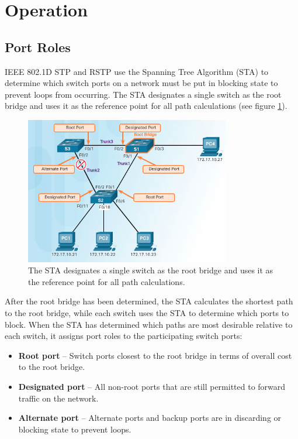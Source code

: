 \section{Operation}
\subsection{Port Roles}
IEEE 802.1D STP and RSTP use the Spanning Tree Algorithm (STA) to determine which switch ports on a network must be put in blocking state to prevent loops from occurring. The STA designates a single switch as the root bridge and uses it as the reference point for all path calculations (see figure \ref{STP-operation}). \par 
\begin{figure}[hbtp]
\centering
\includegraphics[width=0.8\textwidth]{pictures/STP-operation.png}
\caption{The STA designates a single switch as the root bridge and uses it as the reference point for all path calculations.}
\label{STP-operation}
\end{figure}
After  the root bridge has been determined, the STA calculates the shortest path to the root bridge, while each switch uses the STA to determine which ports to block.  When the STA has determined which paths are most desirable relative to each switch, it assigns port roles to the participating switch ports:
\begin{itemize}
\item \textbf{Root port} -- Switch ports closest to the root bridge in terms of overall cost to the root bridge.
\item \textbf{Designated port} -- All non-root ports that are still permitted to forward traffic on the network.
\item \textbf{Alternate port} -- Alternate ports and backup ports are in discarding or blocking state to prevent loops. 
\end{itemize}
